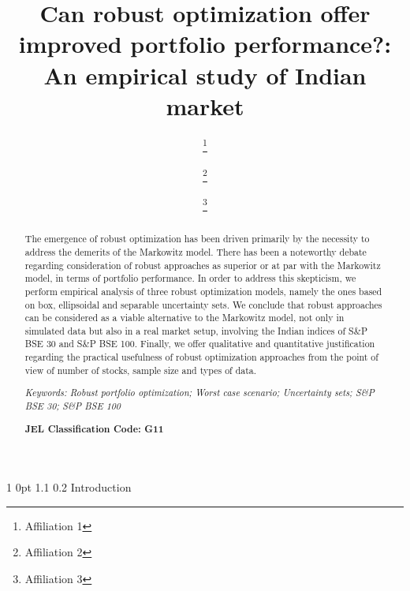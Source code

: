 \documentclass[12pt]{article}
\makeatletter
\numberwithin{equation}{section}
\renewcommand{\section}{
  \@startsection
  {section}%
  {1}%
  {0pt}%
  {1.1\baselineskip}%
  {0.2\baselineskip}%
  {\sc \centering}%
}
\makeatother
\begin{document}
\title{\large\sc Can robust optimization offer improved portfolio performance?: An empirical study of Indian market}
\normalsize
\author{ \thanks{Affiliation 1}
\and {} \thanks{Affiliation 2}
\and {} \thanks{Affiliation 3}}
\date{}
\maketitle
\begin{abstract}

The emergence of robust optimization has been driven primarily by the necessity to address the demerits of the Markowitz model. There has been a noteworthy debate regarding consideration of robust approaches as superior or at par with the Markowitz model, in terms of portfolio performance. In order to address this skepticism, we perform empirical analysis of three robust optimization models, namely the ones based on box, ellipsoidal and separable uncertainty sets. We conclude that robust approaches can be considered as a viable alternative to the Markowitz model, not only in simulated data but also in a real market setup, involving the Indian indices of S\&P BSE 30 and S\&P BSE 100. Finally, we offer qualitative and quantitative justification regarding the practical usefulness of robust optimization approaches from the point of view of number of stocks, sample size and types of data.

{\it Keywords: Robust portfolio optimization; Worst case scenario; Uncertainty sets; S\&P BSE 30; S\&P BSE 100}

{\textbf {JEL Classification Code: G11}}

\end{abstract}

\section{Introduction}
\label{Introduction}
\end{document}
